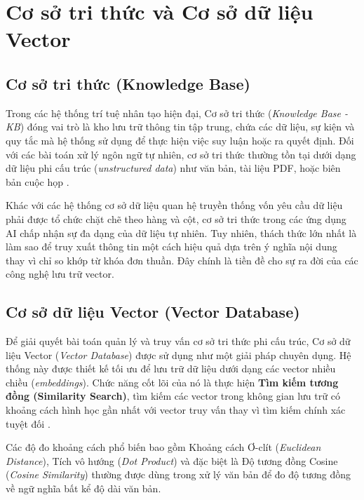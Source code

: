 \section{Cơ sở tri thức và Cơ sở dữ liệu Vector}
\label{sec:kb_vector_db}

\subsection{Cơ sở tri thức (Knowledge Base)}
Trong các hệ thống trí tuệ nhân tạo hiện đại, Cơ sở tri thức (\textit{Knowledge Base - KB}) đóng vai trò là kho lưu trữ thông tin tập trung, chứa các dữ liệu, sự kiện và quy tắc mà hệ thống sử dụng để thực hiện việc suy luận hoặc ra quyết định. Đối với các bài toán xử lý ngôn ngữ tự nhiên, cơ sở tri thức thường tồn tại dưới dạng dữ liệu phi cấu trúc (\textit{unstructured data}) như văn bản, tài liệu PDF, hoặc biên bản cuộc họp \cite{russell2010artificial}.

Khác với các hệ thống cơ sở dữ liệu quan hệ truyền thống vốn yêu cầu dữ liệu phải được tổ chức chặt chẽ theo hàng và cột, cơ sở tri thức trong các ứng dụng AI chấp nhận sự đa dạng của dữ liệu tự nhiên. Tuy nhiên, thách thức lớn nhất là làm sao để truy xuất thông tin một cách hiệu quả dựa trên ý nghĩa nội dung thay vì chỉ so khớp từ khóa đơn thuần. Đây chính là tiền đề cho sự ra đời của các công nghệ lưu trữ vector.

\subsection{Cơ sở dữ liệu Vector (Vector Database)}
Để giải quyết bài toán quản lý và truy vấn cơ sở tri thức phi cấu trúc, Cơ sở dữ liệu Vector (\textit{Vector Database}) được sử dụng như một giải pháp chuyên dụng. Hệ thống này được thiết kế tối ưu để lưu trữ dữ liệu dưới dạng các vector nhiều chiều (\textit{embeddings}). Chức năng cốt lõi của nó là thực hiện \textbf{Tìm kiếm tương đồng (Similarity Search)}, tìm kiếm các vector trong không gian lưu trữ có khoảng cách hình học gần nhất với vector truy vấn thay vì tìm kiếm chính xác tuyệt đối \cite{han2023comprehensive}.

Các độ đo khoảng cách phổ biến bao gồm Khoảng cách Ơ-clít (\textit{Euclidean Distance}), Tích vô hướng (\textit{Dot Product}) và đặc biệt là Độ tương đồng Cosine (\textit{Cosine Similarity}) thường được dùng trong xử lý văn bản để đo độ tương đồng về ngữ nghĩa bất kể độ dài văn bản.

